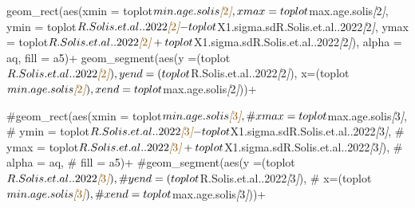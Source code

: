 \documentclass[
]{article}
\newenvironment{Shaded}{\begin{snugshade}}{\end{snugshade}}
\newcommand{\CommentTok}[1]{\textcolor[rgb]{0.56,0.35,0.01}{\textit{#1}}}
\newcommand{\NormalTok}[1]{#1}
\newcommand{\OtherTok}[1]{\textcolor[rgb]{0.56,0.35,0.01}{#1}}
\begin{document}
\begin{Shaded}
\begin{Highlighting}[]
\NormalTok{  geom\_rect(aes(xmin = toplot$min.age.solis}\CommentTok{[}\OtherTok{2}\CommentTok{]}\NormalTok{, }
\NormalTok{                xmax = toplot$max.age.solis}\CommentTok{[}\OtherTok{2}\CommentTok{]}\NormalTok{, }
\NormalTok{                ymin = toplot$R.Solis.et.al..2022}\CommentTok{[}\OtherTok{2}\CommentTok{]}\NormalTok{{-}toplot$X1.sigma.sdR.Solis.et.al..2022}\CommentTok{[}\OtherTok{2}\CommentTok{]}\NormalTok{,}
\NormalTok{                ymax = toplot$R.Solis.et.al..2022}\CommentTok{[}\OtherTok{2}\CommentTok{]}\NormalTok{+toplot$X1.sigma.sdR.Solis.et.al..2022}\CommentTok{[}\OtherTok{2}\CommentTok{]}\NormalTok{),}
\NormalTok{            alpha = aq,}
\NormalTok{            fill = a5)+}
\NormalTok{  geom\_segment(aes(y =(toplot$R.Solis.et.al..2022}\CommentTok{[}\OtherTok{2}\CommentTok{]}\NormalTok{),}
\NormalTok{                   yend =(toplot$R.Solis.et.al..2022}\CommentTok{[}\OtherTok{2}\CommentTok{]}\NormalTok{),}
\NormalTok{                   x=(toplot$min.age.solis}\CommentTok{[}\OtherTok{2}\CommentTok{]}\NormalTok{),}
\NormalTok{                   xend=toplot$max.age.solis}\CommentTok{[}\OtherTok{2}\CommentTok{]}\NormalTok{))+}
  
\NormalTok{  \#geom\_rect(aes(xmin = toplot$min.age.solis}\CommentTok{[}\OtherTok{3}\CommentTok{]}\NormalTok{, }
\NormalTok{   \#             xmax = toplot$max.age.solis}\CommentTok{[}\OtherTok{3}\CommentTok{]}\NormalTok{, }
\NormalTok{    \#            ymin = toplot$R.Solis.et.al..2022}\CommentTok{[}\OtherTok{3}\CommentTok{]}\NormalTok{{-}toplot$X1.sigma.sdR.Solis.et.al..2022}\CommentTok{[}\OtherTok{3}\CommentTok{]}\NormalTok{,}
\NormalTok{     \#           ymax = toplot$R.Solis.et.al..2022}\CommentTok{[}\OtherTok{3}\CommentTok{]}\NormalTok{+toplot$X1.sigma.sdR.Solis.et.al..2022}\CommentTok{[}\OtherTok{3}\CommentTok{]}\NormalTok{),}
\NormalTok{      \#      alpha = aq,}
\NormalTok{       \#     fill = a5)+}
\NormalTok{  \#geom\_segment(aes(y =(toplot$R.Solis.et.al..2022}\CommentTok{[}\OtherTok{3}\CommentTok{]}\NormalTok{),}
\NormalTok{   \#                yend =(toplot$R.Solis.et.al..2022}\CommentTok{[}\OtherTok{3}\CommentTok{]}\NormalTok{),}
\NormalTok{    \#               x=(toplot$min.age.solis}\CommentTok{[}\OtherTok{3}\CommentTok{]}\NormalTok{),}
\NormalTok{     \#              xend=toplot$max.age.solis}\CommentTok{[}\OtherTok{3}\CommentTok{]}\NormalTok{))+}
  

\end{Highlighting}
\end{Shaded}
\end{document}

